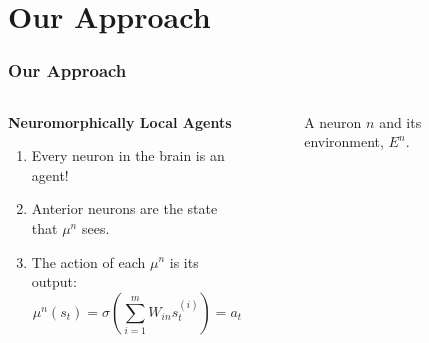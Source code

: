 \documentclass{beamer}
\newcommand*{\Scale}[2][4]{\scalebox{#1}{$#2$}}%
\numberwithin{equation}{subsection}
\numberwithin{theorem}{subsection}
\begin{document}
\section{Our Approach} %
\begin{frame}
  \frametitle{Our Approach}
      \begin{columns}
      \begin{column}{0.6\textwidth}

  \textbf{Neuromorphically Local Agents}
  \begin{enumerate}

    \item Every neuron in the brain is an agent! 
    \item Anterior neurons are the state that $\mu^n$ sees.
    \item The action of each $\mu^n$ is its output: 
    \begin{equation*}
      \mu^n(s_t) = \sigma\left(\sum_{i=1}^m W_{in}s_t^{(i)}   \right) = a_t
    \end{equation*}
  \end{enumerate}
      \end{column}
      \begin{column}{0.4\textwidth}
      \begin{figure}
          \begin{centering}

          \end{centering}
          \caption{A neuron $n$ and its environment, $E^n$.}
      \end{figure}
      
      \end{column}
    \end{columns}

\end{frame}
\end{document}

